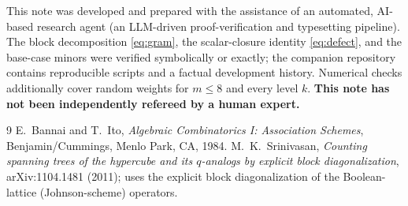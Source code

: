 \documentclass[11pt]{article}
\theoremstyle{remark}
\begin{document}
This note was developed and prepared with the assistance of an automated,
AI-based research agent (an LLM-driven proof-verification and typesetting
pipeline). The block decomposition \eqref{eq:gram}, the scalar-closure
identity \eqref{eq:defect}, and the base-case minors were verified
symbolically or exactly; the companion repository contains reproducible
scripts and a factual development history. Numerical checks additionally
cover random weights for $m\le8$ and every level $k$. \textbf{This note has
not been independently refereed by a human expert.}

\begin{thebibliography}{9}
E.~Bannai and T.~Ito, \emph{Algebraic Combinatorics I: Association
Schemes}, Benjamin/Cummings, Menlo Park, CA, 1984.
M.~K.~Srinivasan, \emph{Counting spanning trees of the hypercube and its
$q$-analogs by explicit block diagonalization}, arXiv:1104.1481 (2011);
uses the explicit block diagonalization of the Boolean-lattice
(Johnson-scheme) operators.
\end{thebibliography}
\end{document}
